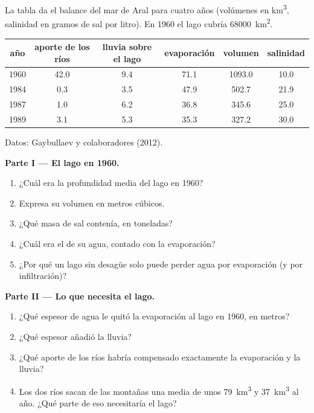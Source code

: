 \begin{problem}
\label{pb:g10:freshwater-resources:1}
La tabla da el balance del mar de Aral para cuatro años (volúmenes en
\unit{km^3}, salinidad en gramos de sal por litro). En 1960 el lago cubría
\qty{68000}{km^2}.
\begin{center}
\small
\begin{tabular}{|c|c|c|c|c|c|}
\hline
año & aporte de los ríos & lluvia sobre el lago & evaporación & volumen & salinidad \\ \hline
1960 & 42.0 & 9.4 & 71.1 & 1093.0 & 10.0 \\ \hline
1984 & 0.3 & 3.5 & 47.9 & 502.7 & 21.9 \\ \hline
1987 & 1.0 & 6.2 & 36.8 & 345.6 & 25.0 \\ \hline
1989 & 3.1 & 5.3 & 35.3 & 327.2 & 30.0 \\ \hline
\end{tabular}

{\small Datos: Gaybullaev y colaboradores (2012).}
\end{center}

\medskip
\noindent\textbf{Parte I --- El lago en 1960.}
\begin{enumerate}
  \item ¿Cuál era la profundidad media del lago en 1960?
  \item Expresa su volumen en metros cúbicos.
  \item ¿Qué masa de sal contenía, en toneladas?
  \item ¿Cuál era el  de su agua, contado con la
        evaporación?
  \item ¿Por qué un lago sin desagüe solo puede perder agua por evaporación
        (y por infiltración)?
\end{enumerate}

\medskip
\noindent\textbf{Parte II --- Lo que necesita el lago.}
\begin{enumerate}[resume]
  \item ¿Qué espesor de agua le quitó la evaporación al lago en 1960, en
        metros?
  \item ¿Qué espesor añadió la lluvia?
  \item ¿Qué aporte de los ríos habría compensado exactamente la evaporación
        y la lluvia?
  \item Los dos ríos sacan de las montañas una media de unos \qty{79}{km^3} y
        \qty{37}{km^3} al año. ¿Qué parte de eso necesitaría el lago?
\end{enumerate}


\end{problem}
